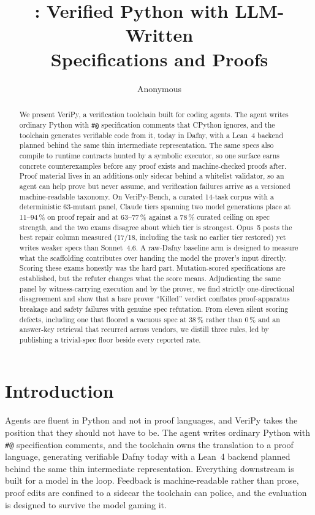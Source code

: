 \documentclass{article}
\title{\toolname{}: Verified Python with LLM-Written\\Specifications and Proofs}
\author{Anonymous}
\newcommand{\toolname}{VeriPy}
\newcommand{\benchname}{VeriPy-Bench}
\begin{document}
\maketitle

\begin{abstract}
We present \toolname{}, a verification toolchain built for coding agents.
The agent writes ordinary Python with \verb|#@| specification comments
that CPython ignores, and the toolchain generates verifiable code from
it, today in Dafny, with a Lean~4 backend planned behind the same thin
intermediate representation. The same specs also compile to runtime
contracts hunted by a symbolic executor, so one surface earns concrete
counterexamples before any proof exists and machine-checked proofs
after. Proof material
lives in an additions-only sidecar behind a whitelist validator, so an
agent can help prove but never assume, and verification failures arrive as
a versioned machine-readable taxonomy. On \benchname{}, a curated 14-task
corpus with a deterministic 63-mutant panel, Claude tiers spanning two
model generations place at 11--94\,\% on proof repair and at 63--77\,\%
against a 78\,\% curated ceiling on spec strength, and the two exams
disagree about which tier is strongest. Opus~5 posts the best repair
column measured (17/18, including the task no earlier tier restored) yet
writes weaker specs than Sonnet~4.6. A raw-Dafny baseline arm is designed
to measure what the scaffolding contributes over handing the model the
prover's input directly. Scoring these exams honestly was the hard part. Mutation-scored
specifications are established, but the refuter changes what the score
means. Adjudicating the same panel by witness-carrying execution and by
the prover, we find strictly one-directional disagreement and show that a
bare prover ``Killed'' verdict conflates proof-apparatus breakage and
safety failures with genuine spec refutation. From eleven silent scoring
defects, including one that floored a vacuous spec at 38\,\% rather than
0\,\% and an answer-key retrieval that recurred across vendors, we distill
three rules, led by publishing a trivial-spec floor beside every reported
rate.
\end{abstract}

\section{Introduction}
\label{sec:intro}

Agents are fluent in Python and not in proof languages, and \toolname{}
takes the position that they should not have to be. The agent writes
ordinary Python with \verb|#@| specification comments, and the toolchain
owns the translation to a proof language, generating verifiable Dafny
today with a Lean~4 backend planned behind the same thin intermediate
representation. Everything downstream is built for a model in the loop. Feedback is machine-readable rather than prose, proof
edits are confined to a sidecar the toolchain can police, and the
evaluation is designed to survive the model gaming it.
\end{document}
